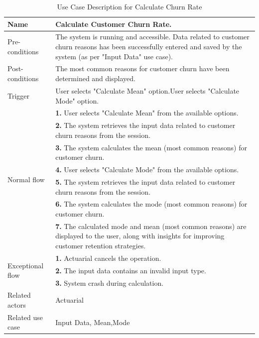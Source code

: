 \begin{table}[htb]
\begin{tabular}{|p{4cm}|p{12cm}|}
         Name & Calculate Customer Churn Rate. \\ \hline 
         Pre-conditions &The system is running and accessible.
Data related to customer churn reasons has been successfully entered and saved by the system (as per "Input Data" use case).
 \\ \hline 
         Post-conditions & The most common reasons for customer churn have been determined and displayed.  \\ \hline
         Trigger & User selects "Calculate Mean" option.User selects "Calculate Mode" option. \\ \hline
        \multirow{7}{*}{Normal flow} 
        & \textbf{1.} User selects "Calculate Mean" from the available options. \\ 
        & \textbf{2.} The system retrieves the input data related to customer churn reasons from the session.   \\ 
 & \textbf{3.} The system calculates the mean (most common reasons) for customer churn.\\ 
  & \textbf{4.} User selects "Calculate Mode" from the available options. \\ 
   & \textbf{5.} The system retrieves the input data related to customer churn reasons from the session. \\ 
        & \textbf{6.} The system calculates the mode (most common reasons) for customer churn.   \\ 
 & \textbf{7.} The calculated mode and mean (most common reasons) are displayed to the user, along with insights for improving customer retention strategies.\\ 

         
        
        \hline
        \multirow{3}{*}{Exceptional flow} 
        & \textbf{1.} Actuarial cancels the operation. \\ 
        & \textbf{2.} The input data contains an invalid input type. \\
         & \textbf{3.} System crash during calculation. \\  \hline 
        Related actors & Actuarial \\ \hline
        Related use case & Input Data, Mean,Mode  \\ \hline
    \end{tabular}
    \caption{Use Case Description for Calculate Churn Rate}
    \label{tab:my_label}
\end{table}
